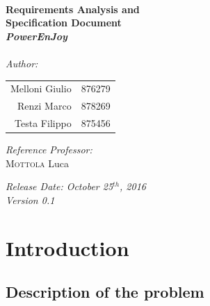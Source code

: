 \documentclass[11pt,a4paper]{report}
\begin{document}
\begin{titlepage}
\HRule \\[0.4cm]
{ \huge \bfseries Requirements Analysis and\\Specification Document\\[0.5cm]\textit{PowerEnJoy}}\\[0.4cm] %
\HRule \\[1.5cm]
 
\Large \emph{Author:}\\
\LARGE{
\begin{center}
\begin{tabular}{ r  l }
	Melloni Giulio & 876279\\
	Renzi Marco & 878269\\
	Testa Filippo & 875456 \\
\end{tabular}
\end{center}
}
\vspace*{0.8cm}
\Large{\emph{Reference Professor:} \\
{\textsc{Mottola} Luca} 
}

 \vspace*{1cm}
{\LARGE {\it Release Date: October 25$^{th}$, 2016\\Version 0.1}}

\end{titlepage}


\tableofcontents

\chapter{Introduction}
\section{Description of the problem}
\end{document}
